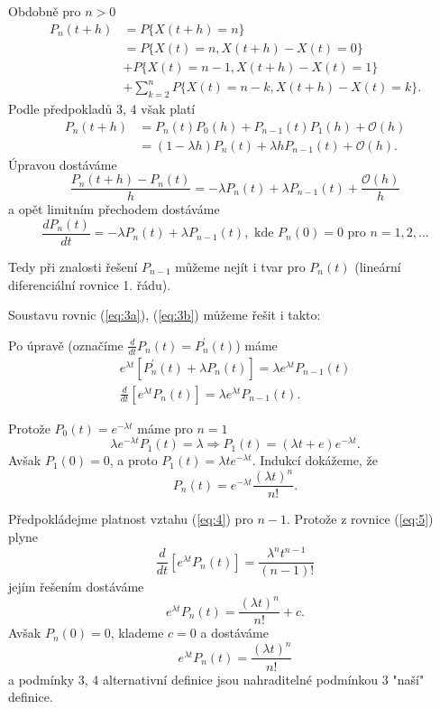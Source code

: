 \documentclass[10pt]{article}
\begin{document}
Obdobně pro $n>0$
\begin{equation}
\begin{split}
P_n(t+h)	&=P\{X(t+h)=n\}\\
		&=P\{X(t)=n,X(t+h)-X(t)=0\}\\
		&+P\{X(t)=n-1,X(t+h)-X(t)=1\}\\
		&+\sum_{k=2}^n P\{X(t)=n-k,X(t+h)-X(t)=k\}.
\end{split}
\end{equation}
Podle předpokladů 3, 4 však platí
\begin{equation}
\begin{split}
P_n(t+h)	&=P_n(t)P_0(h)+P_{n-1}(t)P_1(h) + \mathcal{O}(h)\\
		&=(1-\lambda h) P_n(t) + \lambda h P_{n-1}(t) + \mathcal{O}(h).
\end{split}
\end{equation}
Úpravou dostáváme
\begin{equation}
\frac{P_n(t+h)-P_n(t)}{h}=-\lambda P_n(t) + \lambda P_{n-1}(t) + \frac{\mathcal{O}(h)}{h}
\end{equation}
a opět limitním přechodem dostáváme 
\begin{equation}
\label{eq:3b}
\frac{dP_n(t)}{dt} = -\lambda P_n(t)+\lambda P_{n-1}(t),\text{ kde }P_n(0)=0 \text{ pro }n=1,2,...
\end{equation}

Tedy při znalosti řešení $P_{n-1}$ můžeme nejít i tvar pro $P_n(t)$ (lineární diferenciální rovnice 1. řádu).

Soustavu rovnic (\ref{eq:3a}), (\ref{eq:3b}) můžeme řešit i takto:

Po úpravě (označíme $\frac{d}{dt}P_n(t) = P_n^\prime(t)$) máme
\begin{gather}
e^{\lambda t} [P_n^\prime(t)+ \lambda P_n(t)] = \lambda e^{\lambda t} P_{n-1}(t)\\
\label{eq:5} \frac{d}{dt}[e^{\lambda t} P_{n}(t)] = \lambda e^{\lambda t} P_{n-1}(t).
\end{gather}

Protože $P_0(t)=e^{-\lambda t}$ máme pro $n=1$ $$\lambda e^{-\lambda t} P_{1}(t)=\lambda \Rightarrow P_1(t) = (\lambda t+e)e^{-\lambda t}.$$ Avšak $P_1(0)=0$, a proto $P_1(t) = \lambda t e^{-\lambda t}$. Indukcí dokážeme, že \begin{equation}\label{eq:4} P_n(t) = e^{-\lambda t} \frac{(\lambda t)^n}{n!}.\end{equation}

Předpokládejme platnost vztahu (\ref{eq:4}) pro $n-1$. Protože z rovnice (\ref{eq:5}) plyne $$\frac{d}{dt}[e^{\lambda t} P_{n}(t)]=\frac{\lambda^n t^{n-1}}{(n-1)!}$$ jejím řešením dostáváme $$e^{\lambda t} P_{n}(t) = \frac{(\lambda t)^n}{n!}+c.$$ Avšak $P_n(0)=0$, klademe $c=0$ a dostáváme $$e^{\lambda t} P_{n}(t) = \frac{(\lambda t)^n}{n!}$$ a podmínky 3, 4 alternativní definice jsou nahraditelné podmínkou 3 "naší" definice.
\end{document}
